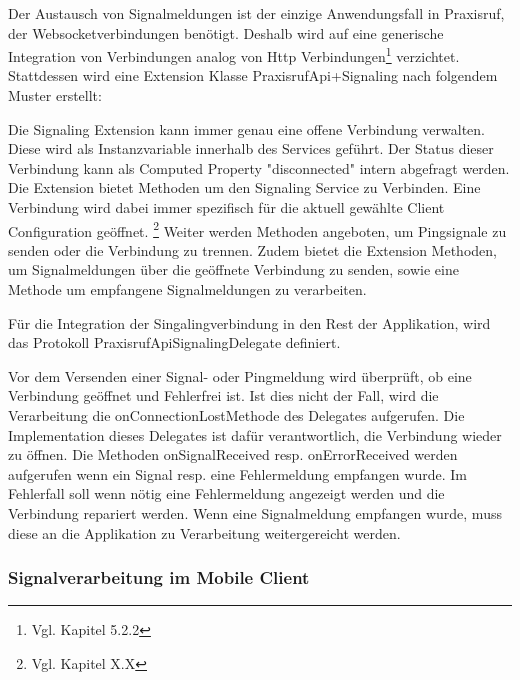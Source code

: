 Der Austausch von Signalmeldungen ist der einzige Anwendungsfall in Praxisruf, der Websocketverbindungen benötigt.
Deshalb wird auf eine generische Integration von Verbindungen analog von Http Verbindungen\footnote{Vgl. Kapitel 5.2.2} verzichtet.
Stattdessen wird eine Extension Klasse PraxisrufApi+Signaling nach folgendem Muster erstellt:



Die Signaling Extension kann immer genau eine offene Verbindung verwalten.
Diese wird als Instanzvariable innerhalb des Services geführt.
Der Status dieser Verbindung kann als Computed Property "disconnected" intern abgefragt werden.
Die Extension bietet Methoden um den Signaling Service zu Verbinden.
Eine Verbindung wird dabei immer spezifisch für die aktuell gewählte Client Configuration geöffnet. \footnote{Vgl. Kapitel X.X}
Weiter werden Methoden angeboten, um Pingsignale zu senden oder die Verbindung zu trennen.
Zudem bietet die Extension Methoden, um Signalmeldungen über die geöffnete Verbindung zu senden,
sowie eine Methode um empfangene Signalmeldungen zu verarbeiten.

Für die Integration der Singalingverbindung in den Rest der Applikation, wird das Protokoll PraxisrufApiSignalingDelegate definiert.



Vor dem Versenden einer Signal- oder Pingmeldung wird überprüft, ob eine Verbindung geöffnet und Fehlerfrei ist.
Ist dies nicht der Fall, wird die Verarbeitung die onConnectionLostMethode des Delegates aufgerufen.
Die Implementation dieses Delegates ist dafür verantwortlich, die Verbindung wieder zu öffnen.
Die Methoden onSignalReceived resp. onErrorReceived werden aufgerufen wenn ein Signal resp. eine Fehlermeldung empfangen wurde.
Im Fehlerfall soll wenn nötig eine Fehlermeldung angezeigt werden und die Verbindung repariert werden.
Wenn eine Signalmeldung empfangen wurde, muss diese an die Applikation zu Verarbeitung weitergereicht werden.

\clearpage

\subsubsection{Signalverarbeitung im Mobile Client}

